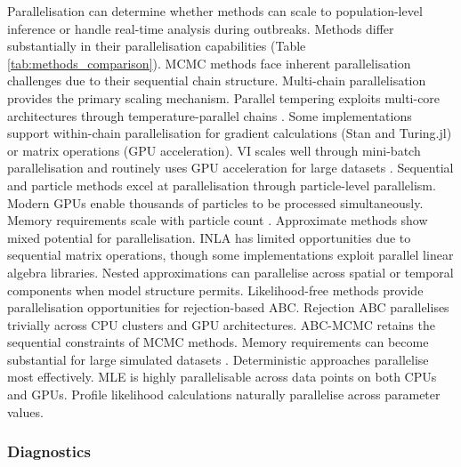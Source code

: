 \documentclass{article}
\begin{document}
Parallelisation can determine whether methods can scale to population-level inference or handle real-time analysis during outbreaks.
Methods differ substantially in their parallelisation capabilities (Table \ref{tab:methods_comparison}).
\ac{MCMC} methods face inherent parallelisation challenges due to their sequential chain structure.
Multi-chain parallelisation provides the primary scaling mechanism.
Parallel tempering exploits multi-core architectures through temperature-parallel chains \citep{surjanovic2023pigeons}.
Some implementations support within-chain parallelisation for gradient calculations (Stan and Turing.jl) or matrix operations (\ac{GPU} acceleration).
\ac{VI} scales well through mini-batch parallelisation and routinely uses \ac{GPU} acceleration for large datasets \citep{hoffman2013stochastic, Abbott2021-delta}.
Sequential and particle methods excel at parallelisation through particle-level parallelism.
Modern \ac{GPU}s enable thousands of particles to be processed simultaneously.
Memory requirements scale with particle count \citep{henriksen2012parallel}.
Approximate methods show mixed potential for parallelisation.
\ac{INLA} has limited opportunities due to sequential matrix operations, though some implementations exploit parallel linear algebra libraries.
Nested approximations can parallelise across spatial or temporal components when model structure permits.
Likelihood-free methods provide parallelisation opportunities for rejection-based ABC.
Rejection \ac{ABC} parallelises trivially across \ac{CPU} clusters and \ac{GPU} architectures.
\ac{ABC}-\ac{MCMC} retains the sequential constraints of \ac{MCMC} methods.
Memory requirements can become substantial for large simulated datasets \citep{kulkarni2022hardware}.
Deterministic approaches parallelise most effectively.
\ac{MLE} is highly parallelisable across data points on both \ac{CPU}s and \ac{GPU}s.
Profile likelihood calculations naturally parallelise across parameter values.

\subsubsection{Diagnostics}
\end{document}
